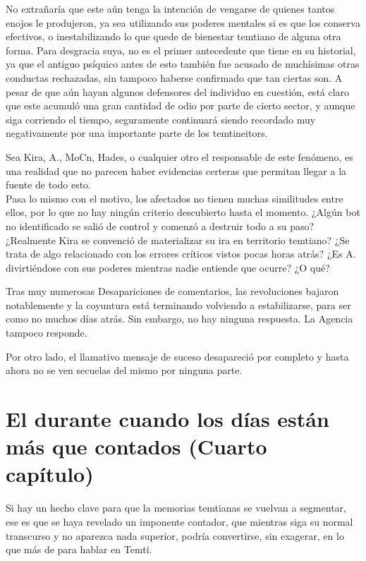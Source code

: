 \documentclass[
  spanish,
]{book}
\begin{document}
No extrañaría que este aún tenga la intención de vengarse de quienes tantos enojos le produjeron, ya sea utilizando sus poderes mentales si es que los conserva efectivos, o inestabilizando lo que quede de bienestar temtiano de alguna otra forma. Para desgracia suya, no es el primer antecedente que tiene en su historial, ya que el antiguo psíquico antes de esto también fue acusado de muchísimas otras conductas rechazadas, sin tampoco haberse confirmado que tan ciertas son. A pesar de que aún hayan algunos defensores del individuo en cuestión, está claro que este acumuló una gran cantidad de odio por parte de cierto sector, y aunque siga corriendo el tiempo, seguramente continuará siendo recordado muy negativamente por una importante parte de los temtineitors.

Sea Kira, A., MoCn, Hades, o cualquier otro el responsable de este fenómeno, es una realidad que no parecen haber evidencias certeras que permitan llegar a la fuente de todo esto.\\
Pasa lo mismo con el motivo, los afectados no tienen muchas similitudes entre ellos, por lo que no hay ningún criterio descubierto hasta el momento. ¿Algún bot no identificado se salió de control y comenzó a destruir todo a su paso? ¿Realmente Kira se convenció de materializar su ira en territorio temtiano? ¿Se trata de algo relacionado con los errores críticos vistos pocas horas atrás? ¿Es A. divirtiéndose con sus poderes mientras nadie entiende que ocurre? ¿O qué?

Tras muy numerosas Desapariciones de comentarios, las revoluciones bajaron notablemente y la coyuntura está terminando volviendo a estabilizarse, para ser como no muchos días atrás. Sin embargo, no hay ninguna respuesta. La Agencia tampoco responde.

Por otro lado, el llamativo mensaje de suceso desapareció por completo y hasta ahora no se ven secuelas del mismo por ninguna parte.

\hypertarget{el-durante-cuando-los-duxedas-estuxe1n-muxe1s-que-contados-cuarto-capuxedtulo}{%
\chapter{El durante cuando los días están más que contados (Cuarto capítulo)}\label{el-durante-cuando-los-duxedas-estuxe1n-muxe1s-que-contados-cuarto-capuxedtulo}}

Si hay un hecho clave para que la memorias temtianas se vuelvan a segmentar, ese es que se haya revelado un imponente contador, que mientras siga su normal transcurso y no aparezca nada superior, podría convertirse, sin exagerar, en lo que más de para hablar en Temti.
\end{document}
